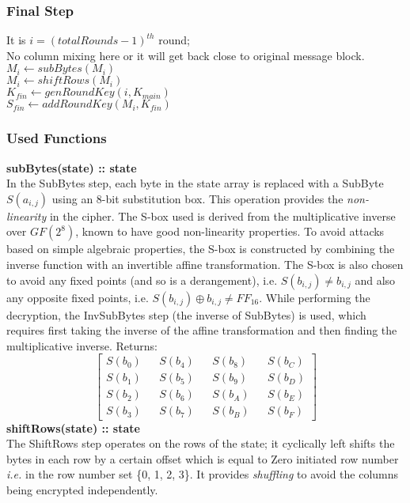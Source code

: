 \subsubsection{Final Step}
It is $ i = (totalRounds - 1)^{th} $ round;\\ No column mixing here or it will get back close to original message block. \\
\algoTab \algoTab $ M_i \gets subBytes(M_i) $ \\
\algoTab \algoTab $ M_i \gets shiftRows(M_i) $ \\
\algoTab \algoTab $ K_{fin} \gets genRoundKey(i, K_{main}) $ \\
\algoTab \algoTab $ S_{fin} \gets addRoundKey(M_i, K_{fin}) $ \\

\subsubsection{Used Functions}
\textbf{subBytes(state) :: state} \\
In the SubBytes step, each byte in the state array is replaced with a SubByte $S(a_{i,j})$ using an 8-bit substitution box. This operation provides the \textit{non-linearity} in the cipher. The S-box used is derived from the multiplicative inverse over $GF(2^8)$, known to have good non-linearity properties. To avoid attacks based on simple algebraic properties, the S-box is constructed by combining the inverse function with an invertible affine transformation. The S-box is also chosen to avoid any fixed points (and so is a derangement), i.e. $ S(b_{i, j}) \neq b_{i, j} $ and also any opposite fixed points, i.e. $ S(b_{i, j}) \oplus b_{i, j} \neq FF_{16} $. While performing the decryption, the InvSubBytes step (the inverse of SubBytes) is used, which requires first taking the inverse of the affine transformation and then finding the multiplicative inverse.
Returns:
$$
\begin{bmatrix}
S(b_0) && S(b_4) && S(b_8) && S(b_C) \\
S(b_1) && S(b_5) && S(b_9) && S(b_D) \\
S(b_2) && S(b_6) && S(b_A) && S(b_E) \\
S(b_3) && S(b_7) && S(b_B) && S(b_F)
\end{bmatrix}
$$
\textbf{shiftRows(state) :: state} \\
The ShiftRows step operates on the rows of the state; it cyclically left shifts the bytes in each row by a certain offset which is equal to Zero initiated row number \textit{i.e.} in the row number set \{0, 1, 2, 3\}. It provides \textit{shuffling} to avoid the columns being encrypted independently.
